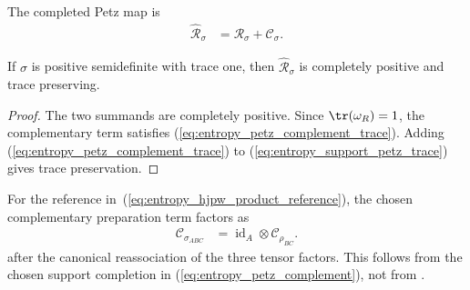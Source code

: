 \begin{definition}
    \label{def:partial_trace_petz_channel}
    \leanok
    The completed Petz map is
    \begin{align}
        \widehat{\mathcal R}_\sigma
        &=\mathcal R_\sigma+\mathcal C_\sigma.
        \label{eq:entropy_completed_petz}
    \end{align}
\end{definition}

\begin{theorem}
    \label{thm:partial_trace_petz_channel_cptp}
    \leanok
    If $\sigma$ is positive semidefinite with trace one, then
    $\widehat{\mathcal R}_\sigma$ is completely positive and trace preserving.
\end{theorem}

\begin{proof}\leanok
    The two summands are completely positive. Since
    $\tr(\omega_R)=1$, the complementary term satisfies
    (\ref{eq:entropy_petz_complement_trace}). Adding
    (\ref{eq:entropy_petz_complement_trace}) to
    (\ref{eq:entropy_support_petz_trace}) gives trace preservation.
\end{proof}

\begin{theorem}
    \label{thm:entropy_petz_complement_maximally_mixed_tensor}
    \leanok
    For the reference in~(\ref{eq:entropy_hjpw_product_reference}), the chosen
    complementary preparation term factors as
    \begin{align}
        \mathcal C_{\sigma_{ABC}}
        &=\operatorname{id}_A\otimes\mathcal C_{\rho_{BC}}.
        \label{eq:entropy_petz_complement_factorization}
    \end{align}
    after the canonical reassociation of the three tensor factors. This follows
    from the chosen support completion in
    (\ref{eq:entropy_petz_complement}), not from
    \cite[equation~(10)]{Hayden2004Structure}.
\end{theorem}

